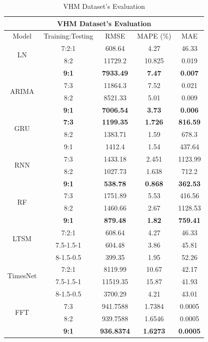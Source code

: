 \documentclass{ieeeojies}
\begin{document}
  \begin{table}[H]
    \centering
    \begin{tabular}{|c|c|c|c|c|}
           \hline
           \multicolumn{5}{|c|}{\textbf{VHM Dataset's Evaluation}}\\
           \hline
           \centering Model & Training:Testing & RMSE & MAPE (\%) & MAE\\
           \hline
           \multirow{2}{*}{LN} & 7:2:1 & 608.64 & 4.27 & 46.33 \\ & 8:2 & 11729.2 & 10.825 & 0.019 \\ & \textbf{9:1} & \textbf{7933.49} & \textbf{7.47} & \textbf{0.007}\\
           \hline
           \multirow{2}{*}{ARIMA} & 7:3&11864.3&7.52&0.021\\ & 8:2&8521.33&5.01&0.009 \\ & \textbf{9:1} & \textbf{7006.54} & \textbf{3.73} & \textbf{0.006}\\
           \hline
           \multirow{2}{*}{GRU} & \textbf{7:3} & \textbf{1199.35} & \textbf{1.726} & \textbf{816.59} \\ & 8:2 &  1383.71 & 1.59 &678.3 \\ & 9:1 & 1412.4	&1.54&437.64\\
           \hline
           \multirow{2}{*}{RNN} & 7:3 &  1433.18 &  2.451 & 1123.99 \\ & 8:2 &  1027.73 & 1.638 &  712.2\\ & \textbf{9:1} & \textbf{538.78} & \textbf{0.868} & \textbf{362.53} \\
           \hline
           \multirow{2}{*}{RF} & 7:3	& 1751.89 & 5.53 &  416.56 \\ & 8:2 & 1460.66 & 2.67 & 1128.53 \\ & \textbf{9:1} & \textbf{879.48} & \textbf{1.82} & \textbf{759.41}\\
           \hline
           \multirow{2}{*}{LTSM} & 7:2:1 & 608.64 & 4.27 & 46.33 \\ & 7.5-1.5-1 & 604.48 & 3.86 & 45.81 \\ & 8-1.5-0.5 & 399.35	&1.95&52.26\\
           \hline
           \multirow{2}{*}{TimesNet} & 7:2:1 & 8119.99 & 10.67 & 42.17 \\ & 7.5-1.5-1 & 11519.35 & 15.87 & 41.93 \\ & 8-1.5-0.5 & 3700.29	& 4.21 &43.01\\
           \hline
           \multirow{2}{*}{FFT} & 7:3 & 941.7588 &  1.7384 &  0.0005 \\ & 8:2 & 939.7588 &  1.6546 &  0.0005 \\ & \textbf{9:1} & \textbf{936.8374} & \textbf{1.6273} & \textbf{0.0005}\\
           \hline
      \end{tabular}
      \caption{VHM Dataset's Evaluation}
      \label{vcbresult}
  \end{table}
\end{document}
